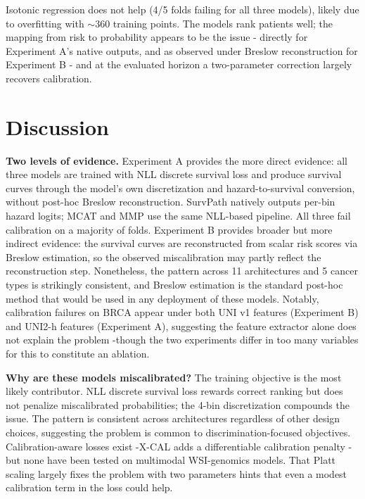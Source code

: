 \documentclass[pmlr]{jmlr}
\begin{document}
Isotonic regression does not help (4/5 folds failing for all three models), likely due to overfitting with $\sim$360 training points. The models rank patients well; the mapping from risk to probability appears to be the issue - directly for Experiment A's native outputs, and as observed under Breslow reconstruction for Experiment B - and at the evaluated horizon a two-parameter correction largely recovers calibration.

\section{Discussion}

\textbf{Two levels of evidence.} Experiment A provides the more direct evidence: all three models are trained with NLL discrete survival loss and produce survival curves through the model's own discretization and hazard-to-survival conversion, without post-hoc Breslow reconstruction. SurvPath natively outputs per-bin hazard logits; MCAT and MMP use the same NLL-based pipeline. All three fail calibration on a majority of folds. Experiment B provides broader but more indirect evidence: the survival curves are reconstructed from scalar risk scores via Breslow estimation, so the observed miscalibration may partly reflect the reconstruction step. Nonetheless, the pattern across 11 architectures and 5 cancer types is strikingly consistent, and Breslow estimation is the standard post-hoc method that would be used in any deployment of these models. Notably, calibration failures on BRCA appear under both UNI v1 features (Experiment B) and UNI2-h features (Experiment A), suggesting the feature extractor alone does not explain the problem -though the two experiments differ in too many variables for this to constitute an ablation.

\textbf{Why are these models miscalibrated?} The training objective is the most likely contributor. NLL discrete survival loss rewards correct ranking but does not penalize miscalibrated probabilities; the 4-bin discretization compounds the issue. The pattern is consistent across architectures regardless of other design choices, suggesting the problem is common to discrimination-focused objectives. Calibration-aware losses exist -X-CAL \citep{goldstein2020xcal} adds a differentiable calibration penalty -but none have been tested on multimodal WSI-genomics models. That Platt scaling largely fixes the problem with two parameters hints that even a modest calibration term in the loss could help.
\end{document}
